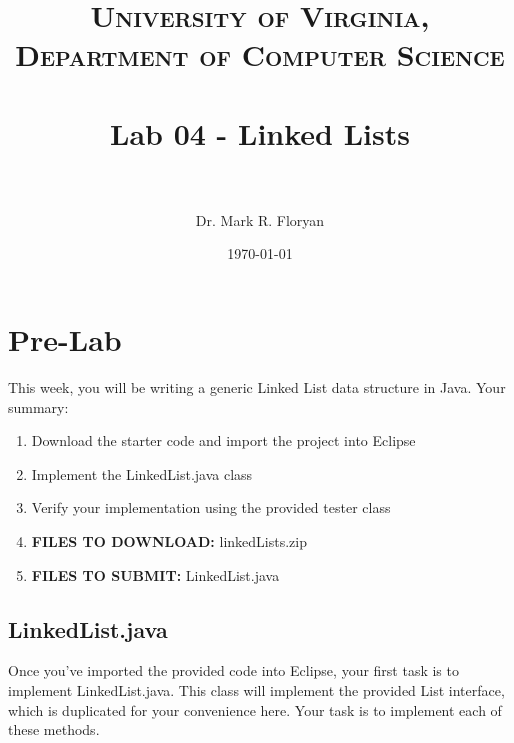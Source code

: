 \documentclass[paper=a4, fontsize=11pt, parskip=full]{scrartcl} %
\title{	
\normalfont \normalsize 
\textsc{University of Virginia, Department of Computer Science} \\ [25pt] %
\horrule{0.5pt} \\[0.4cm] %
\huge Lab 04 - Linked Lists \\ %
\horrule{2pt} \\[0.5cm] %
}
\author{Dr. Mark R. Floryan} %
\date{\normalsize\today} %
\numberwithin{equation}{section} %
\numberwithin{figure}{section} %
\numberwithin{table}{section} %
\begin{document}
\maketitle %


\section{Pre-Lab}

This week, you will be writing a generic Linked List data structure in Java. Your summary:

\begin{enumerate}
	\item Download the starter code and import the project into Eclipse
	\item Implement the LinkedList.java class
	\item Verify your implementation using the provided tester class
	\item \textbf{FILES TO DOWNLOAD:} linkedLists.zip
	\item \textbf{FILES TO SUBMIT:} LinkedList.java
\end{enumerate}


\subsection{LinkedList.java}

Once you've imported the provided code into Eclipse, your first task is to implement LinkedList.java. This class will implement the provided List interface, which is duplicated for your convenience here. Your task is to implement each of these methods.
\end{document}
